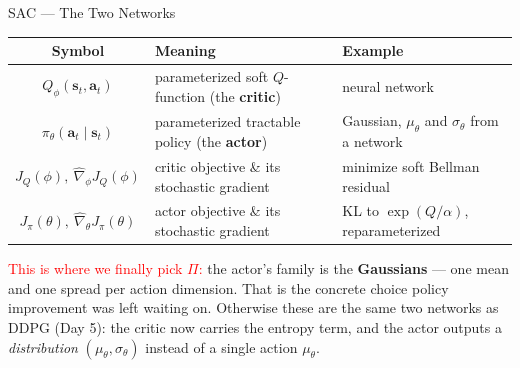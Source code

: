 \begin{frame}{SAC --- The Two Networks}
\renewcommand{\arraystretch}{1.8}
\begin{center}
\small
\begin{tabular}{|c|p{}|p{}|}
\hline
\textbf{Symbol} & \textbf{Meaning} & \textbf{Example} \\
\hline
$Q_\phi(\mathbf{s}_t, \mathbf{a}_t)$
    & parameterized soft $Q$-function (the \textbf{critic})
    & neural network \\
\hline
$\pi_\theta(\mathbf{a}_t \mid \mathbf{s}_t)$
    & parameterized tractable policy (the \textbf{actor})
    & Gaussian, $\mu_\theta$ and $\sigma_\theta$ from a network \\
\hline
$J_Q(\phi),\ \hat{\nabla}_\phi J_Q(\phi)$
    & critic objective \& its stochastic gradient
    & minimize soft Bellman residual \\
\hline
$J_\pi(\theta),\ \hat{\nabla}_\theta J_\pi(\theta)$
    & actor objective \& its stochastic gradient
    & KL to $\exp(Q/\alpha)$, reparameterized \\
\hline
\end{tabular}
\end{center}
\vspace{0.4em}
{\footnotesize \textcolor{red}{This is where we finally pick $\Pi$:} the actor's family is the \textbf{Gaussians} --- one mean and one spread per action dimension. That is the concrete choice policy improvement was left waiting on. Otherwise these are the same two networks as DDPG (Day 5): the critic now carries the entropy term, and the actor outputs a \emph{distribution} $(\mu_\theta,\sigma_\theta)$ instead of a single action $\mu_\theta$.}
\end{frame}
